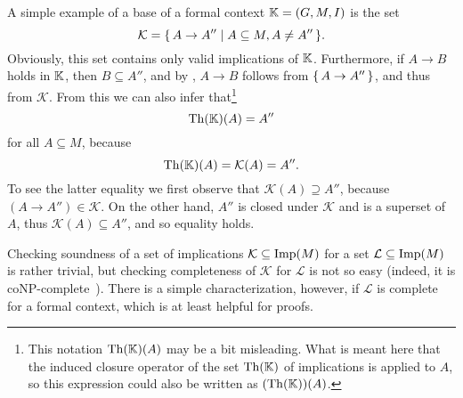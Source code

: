 A simple example of a base of a formal context ${\mathbb{K}} = (G, M, I)$ is the set
\begin{equation}
  \label{eq:10}
  \mathcal{K} = {\{\, A \to A'' \mid A \subseteq M, A \neq A'' \,\}}.
\end{equation}
Obviously, this set contains only valid implications of ${\mathbb{K}}$.  Furthermore, if $A \to
B$ holds in ${\mathbb{K}}$, then $B \subseteq A''$, and by
, $A \to
B$ follows from ${\{\, A \to A'' \,\}}$, and thus from $\mathcal{K}$.  From this we can also
infer that\footnote{This notation $\operatorname{Th}({\mathbb{K}})(A)$ may be a bit misleading.  What is meant
  here that the induced closure operator of the set $\operatorname{Th}({\mathbb{K}})$ of implications is
  applied to $A$, so this expression could also be written as $(\operatorname{Th}({\mathbb{K}}))(A)$.}
\begin{equation*}
  \operatorname{Th}({\mathbb{K}})(A) = A''
\end{equation*}
for all $A \subseteq M$, because
\begin{equation*}
  \operatorname{Th}({\mathbb{K}})(A) = \mathcal{K}(A) = A''.
\end{equation*}
To see the latter equality we first observe that $\mathcal{K}(A) \supseteq A''$, because
$(A \to A'') \in \mathcal{K}$.  On the other hand, $A''$ is closed under $\mathcal{K}$ and
is a superset of $A$, thus $\mathcal{K}(A) \subseteq A''$, and so equality holds.

Checking soundness of a set of implications $\mathcal{K} \subseteq \operatorname{Imp}(M)$ for a set
$\mathcal{L} \subseteq \operatorname{Imp}(M)$ is rather trivial, but checking completeness of
$\mathcal{K}$ for $\mathcal{L}$ is not so easy (indeed, it is coNP-complete~\cite[Theorem
12]{DBLP:journals/jair/Khardon95}).  There is a simple characterization, however, if
$\mathcal{L}$ is complete for a formal context, which is at least helpful for proofs.

